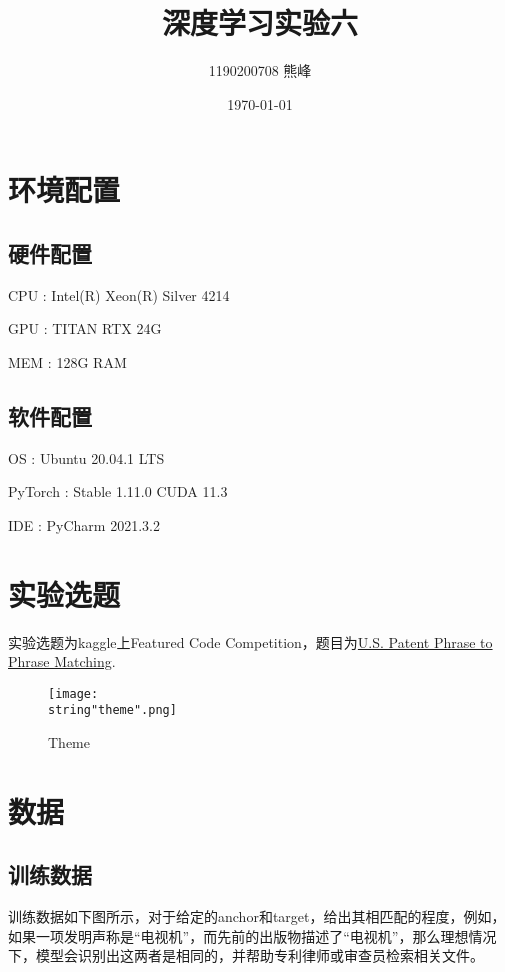 \documentclass[UTF8]{ctexart}
\title{深度学习实验六}
\author{1190200708 熊峰}
\date{\today}
\begin{document}
 
\maketitle 

\newpage
\tableofcontents
\newpage

\section{环境配置}
\subsection{硬件配置}
CPU : Intel(R) Xeon(R) Silver 4214 \par
GPU : TITAN RTX 24G \par
MEM : 128G RAM  \par
\subsection{软件配置}
OS : Ubuntu 20.04.1 LTS \par
PyTorch : Stable 1.11.0  CUDA 11.3 \par
IDE : PyCharm 2021.3.2 \par

\section{实验选题}
实验选题为kaggle上Featured Code Competition，题目为\href{https://www.kaggle.com/competitions/us-patent-phrase-to-phrase-matching/overview}{U.S. Patent Phrase to Phrase Matching}.\par 

\begin{figure}[H]
    \begin{center}
        \texttt{[image: \\string"theme".png]}
    \caption{Theme}
    \label{fig:1}
    \end{center}
    \end{figure}
\par

\section{数据}
\subsection{训练数据}
训练数据如下图所示，对于给定的anchor和target，给出其相匹配的程度，例如，如果一项发明声称是“电视机”，而先前的出版物描述了“电视机”，那么理想情况下，模型会识别出这两者是相同的，并帮助专利律师或审查员检索相关文件。\par 
\end{document}
